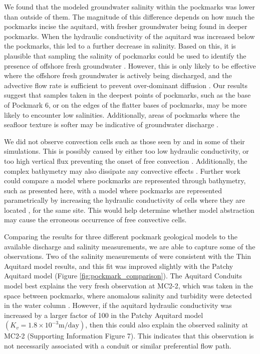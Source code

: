 \documentclass[pdflatex,sn-apa]{sn-jnl}%
\begin{document}
We found that the modeled groundwater salinity within the pockmarks was lower than outside of them.
The magnitude of this difference depends on how much the pockmarks incise the aquitard, with fresher groundwater being found in deeper pockmarks.
When the hydraulic conductivity of the aquitard was increased below the pockmarks, this led to a further decrease in salinity.
Based on this, it is plausible that sampling the salinity of pockmarks could be used to identify the presence of offshore fresh groundwater \citep{hoffmann_fresh_2023, hoffmann_complex_2020}.
However, this is only likely to be effective where the offshore fresh groundwater is actively being discharged, and the advective flow rate is sufficient to prevent over-dominant diffusion \citep{micallef_offshore_2021}.
Our results suggest that samples taken in the deepest points of pockmarks, such as the base of Pockmark 6, or on the edges of the flatter bases of pockmarks,
may be more likely to encounter low salinities. Additionally, areas of pockmarks where the seafloor texture is softer may be indicative of groundwater discharge \citep{harding_characteristics_2000, hoffmann_fresh_2023}.

We did not observe convection cells such as those seen by \cite{kaleris_modelling_2002} and \cite{mulligan_role_2007} in some of their simulations.
This is possibly caused by either too low hydraulic conductivity, or too high vertical flux preventing the onset of free convection \citep{greskowiak_tideinduced_2014}.
Additionally, the complex bathymetry may also dissipate any convective effects \citep{simmons_variable-density_2001}.
Further work could compare a model where pockmarks are represented through bathymetry, such as presented here,
with a model where pockmarks are represented parametrically by increasing the hydraulic conductivity of cells where they are located \citep{kaleris_modelling_2002},
for the same site.
This would help determine whether model abstraction may cause the erroneous occurrence of free convective cells.

Comparing the results for three different pockmark geological models to the available discharge and salinity measurements, we are able to capture some of the observations.
Two of the salinity measurements of \cite{hoffmann_fresh_2023} were consistent with the Thin Aquitard model results,
and this fit was improved slightly with the Patchy Aquitard model (Figure \ref{fig:pockmark_comparison}).
The Aquitard Conduits model best explains the very fresh observation at MC2-2, which was taken in the space between pockmarks,
where anomalous salinity and turbidity were detected in the water column \citep{hoffmann_fresh_2023}.
However, if the aquitard hydraulic conductivity was increased by a larger factor of 100 in the Patchy Aquitard model $(K_v=1.8\times10^{-3} \mathrm{m/day})$,
then this could also explain the observed salinity at MC2-2  (Supporting Information Figure 7).
This indicates that this observation is not necessarily associated with a conduit or similar preferential flow path.
\end{document}
